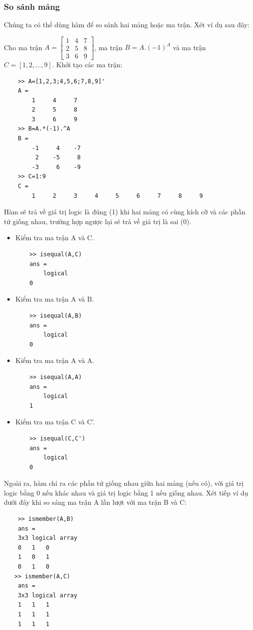 \documentclass[12pt,a4paper]{article}
\begin{document}
\subsubsection{So sánh mảng}
Chúng ta có thể dùng hàm  để so sánh hai mảng hoặc ma trận. Xét ví dụ sau đây:
\begin{example}
Cho ma trận $A=\begin{bmatrix} 1 & 4 & 7 \\ 2 & 5 & 8 \\ 3 & 6 & 9 \end{bmatrix}$, ma trận $B=A.(-1)^A$ và ma trận $C=[1, 2, ... , 9]$. Khởi tạo các ma trận:
\begin{lstlisting}
	>> A=[1,2,3;4,5,6;7,8,9]'
	A =
     	1     4     7
     	2     5     8
     	3     6     9
	>> B=A.*(-1).^A
	B =
    	-1     4    -7
     	 2    -5     8
    	-3     6    -9
	>> C=1:9
	C =
     	1     2     3     4     5     6     7     8     9
\end{lstlisting}
Hàm  sẽ trả về giá trị logic là đúng (1) khi hai mảng có cùng kích cỡ và các phần tử giống nhau, trường hợp ngược lại sẽ trả về giá trị là sai (0).
\begin{itemize}
	\item Kiểm tra ma trận A và C.
\begin{lstlisting}
	>> isequal(A,C)
	ans =
  		logical
   	0
\end{lstlisting}
	\item Kiểm tra ma trận A và B.
\begin{lstlisting}
	>> isequal(A,B)
	ans =
  		logical
   	0
\end{lstlisting}
	\item Kiểm tra ma trận A và A.
\begin{lstlisting}
	>> isequal(A,A)
	ans =
  		logical
   	1
\end{lstlisting}
	\item Kiểm tra ma trận C và C'.
\begin{lstlisting}
	>> isequal(C,C')
	ans =
  		logical
   	0
\end{lstlisting}
\end{itemize}
\end{example}
Ngoài ra, hàm  chỉ ra các phần tử giống nhau giữa hai mảng (nếu có), với giá trị logic bằng 0 nếu khác nhau và giá trị logic bằng 1 nếu giống nhau. Xét tiếp ví dụ dưới đây khi so sáng ma trận A lần lượt với ma trận B và C:
\begin{lstlisting}
	>> ismember(A,B)
	ans =
  	3x3 logical array
   	0   1   0
   	1   0   1
   	0   1   0
   >> ismember(A,C)
	ans =
  	3x3 logical array
   	1   1   1
   	1   1   1
   	1   1   1
\end{lstlisting}
\end{document}

